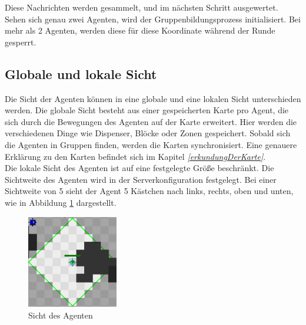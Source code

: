 Diese Nachrichten werden gesammelt, und im nächsten Schritt ausgewertet. Sehen sich genau zwei Agenten, wird der Gruppenbildungsprozess initialisiert. Bei mehr als 2 Agenten, werden diese für diese Koordinate während der Runde gesperrt. \\


\subsection{Globale und lokale Sicht} \label{kap:lokaleSicht}
Die Sicht der Agenten können in eine globale und eine lokalen Sicht unterschieden werden. Die globale Sicht besteht aus einer gespeicherten Karte pro Agent, die sich durch die Bewegungen des Agenten auf der Karte erweitert. Hier werden die verschiedenen Dinge wie Dispenser, Blöcke oder Zonen gespeichert. Sobald sich die Agenten in Gruppen finden, werden die Karten synchronisiert. Eine genauere Erklärung zu den Karten befindet sich im Kapitel \textit{\ref{erkundungDerKarte}}.\\

Die lokale Sicht des Agenten ist auf eine festgelegte Größe beschränkt. Die Sichtweite des Agenten wird in der Serverkonfiguration festgelegt. Bei einer Sichtweite von 5 sieht der Agent 5 Kästchen nach links, rechts, oben und unten, wie in Abbildung \ref{fig:agentensicht} dargestellt.
\begin{figure}
	\centering
	\includegraphics[width=150px]{bilder/agentensicht}
	\caption{Sicht des Agenten}
	\label{fig:agentensicht}
\end{figure}

